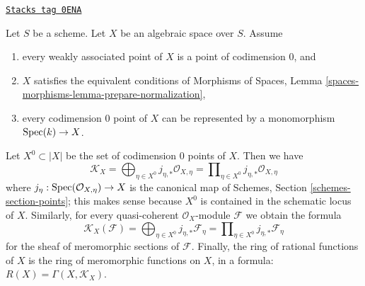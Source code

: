 \begin{lemma}
\label{spaces-divisors-lemma-compute-meromorphic}
\href{https://stacks.math.columbia.edu/tag/0ENA}{\texttt{Stacks tag 0ENA}}

Let $S$ be a scheme. Let $X$ be an algebraic space over $S$. Assume
\begin{enumerate}
\item[(a)] every weakly associated point of $X$
is a point of codimension $0$, and
\item[(b)] $X$ satisfies the equivalent conditions
of Morphisms of Spaces, Lemma
\ref{spaces-morphisms-lemma-prepare-normalization},
\item[(c)] every codimension $0$ point of $X$ can be represented
by a monomorphism $\operatorname{Spec}(k) \to X$.
\end{enumerate}
Let $X^0 \subset |X|$ be the set of codimension $0$ points of $X$.
Then we have
$$
\mathcal{K}_X =
\bigoplus\nolimits_{\eta \in X^0} j_{\eta, *}\mathcal{O}_{X, \eta} =
\prod\nolimits_{\eta \in X^0} j_{\eta, *}\mathcal{O}_{X, \eta}
$$
where $j_\eta : \operatorname{Spec}(\mathcal{O}_{X, \eta}) \to X$ is the canonical map
of Schemes, Section \ref{schemes-section-points}; this makes sense because
$X^0$ is contained in the schematic locus of $X$. Similarly,
for every quasi-coherent $\mathcal{O}_X$-module $\mathcal{F}$
we obtain the formula
$$
\mathcal{K}_X(\mathcal{F}) =
\bigoplus\nolimits_{\eta \in X^0} j_{\eta, *}\mathcal{F}_\eta =
\prod\nolimits_{\eta \in X^0} j_{\eta, *}\mathcal{F}_\eta
$$
for the sheaf of meromorphic sections of $\mathcal{F}$.
Finally, the ring of rational functions of $X$ is the ring of meromorphic
functions on $X$, in a formula: $R(X) = \Gamma(X, \mathcal{K}_X)$.
\end{lemma}

